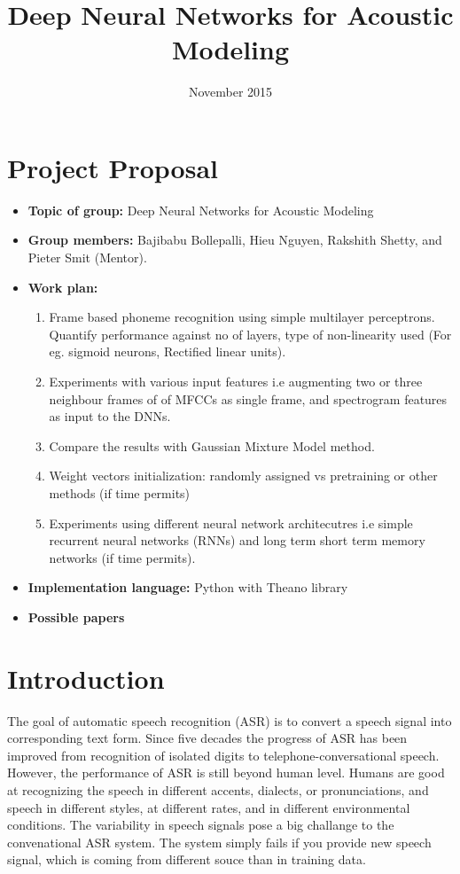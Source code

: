 \documentclass{article}
\title{Deep Neural Networks for Acoustic Modeling}
\author{}
\date{November 2015}
\begin{document}
\maketitle

\section{Project Proposal}
\begin{itemize}
 \item \textbf{Topic of group:} Deep Neural Networks for Acoustic Modeling
 \item \textbf{Group members:} Bajibabu Bollepalli,  Hieu Nguyen,  Rakshith Shetty, and Pieter Smit (Mentor).
 \item \textbf{Work plan:}
   \begin{enumerate}
   \item Frame based phoneme recognition using simple multilayer perceptrons. Quantify performance against no of layers, type of non-linearity used (For eg. sigmoid neurons, Rectified linear units).
   \item Experiments with various input features i.e augmenting two or three neighbour frames of of MFCCs as single frame, and spectrogram features as input to the DNNs.
   \item Compare the results with Gaussian Mixture Model method.
   \item Weight vectors initialization: randomly assigned vs pretraining or other methods (if time permits)
   \item Experiments using different neural network architecutres i.e simple recurrent neural networks (RNNs) and long term short term memory networks (if time permits).
   \end{enumerate}
 \item \textbf{Implementation language:} Python with Theano library
 \item \textbf{Possible papers}
 \citep{Hinton2012, Alex2013, Mohamed2012}
\end{itemize}


\section{Introduction}
The goal of automatic speech recognition (ASR) is to convert a speech signal into corresponding text form. Since five decades the progress of ASR has been improved from recognition of isolated digits to telephone-conversational speech. However, the performance of ASR is still beyond human level. Humans are good at recognizing the speech in different accents, dialects, or pronunciations, and speech in different styles, at different rates, and in different environmental conditions. The variability in speech signals pose a big challange to the convenational ASR system. The system simply fails if you provide new speech signal, which is coming from different souce than in training data. 
\end{document}
